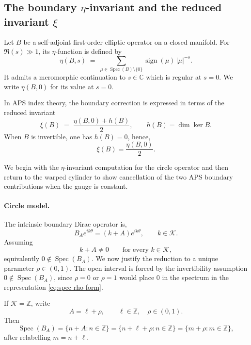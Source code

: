 \documentclass[11pt]{article}
\newcommand{\C}{\mathbb{C}}
\theoremstyle{definition}
\DeclareMathOperator{\Spec}{Spec}
\DeclareMathOperator{\sign}{sign}
\numberwithin{equation}{section}
\begin{document}
\subsection{The boundary $\eta$-invariant and the reduced invariant $\xi$}
\label{subsec:boundary-eta}

Let $B$ be a self-adjoint first-order elliptic operator on a closed manifold.
For $\Re(s)\gg 1$, its $\eta$-function is defined by
\begin{equation}
\label{eq:eta-rewrite}
\eta(B,s)\;=\;\sum_{\mu\in \Spec(B)\setminus\{0\}} \sign(\mu)\,|\mu|^{-s}.
\end{equation}
It admits a meromorphic continuation to $s\in\C$ which is regular at $s=0$. We write \(\eta(B,0)\) for its value at \(s=0\).

In APS index theory, the boundary correction is expressed in terms of the reduced invariant
\begin{equation}
\label{eq:xi-def-header-rewrite}
\xi(B)\;=\;\frac{\eta(B,0)+h(B)}{2},
\qquad
h(B)=\dim\ker B.
\end{equation}
When $B$ is invertible, one has $h(B)=0$, hence,
\begin{equation}
\xi(B)=\frac{\eta(B,0)}{2}.
\end{equation}

We begin with the \(\eta\)-invariant computation for the circle operator and then return to the warped cylinder to show cancellation of the two APS boundary contributions when the gauge is constant.

\paragraph{Circle model.}
The intrinsic boundary Dirac operator is,
\begin{equation}
B_A e^{ik\theta}=(k+A)e^{ik\theta},
\qquad k\in\mathcal K.
\end{equation}
Assuming
\begin{equation}
k+A\neq 0 \qquad \text{for every } k\in\mathcal K,
\end{equation}
equivalently $0\notin\Spec(B_A)$.
We now justify the reduction to a unique parameter \(\rho\in(0,1)\). The open interval is forced by the invertibility assumption \(0\notin\Spec(B_A)\), since \(\rho=0\) or \(\rho=1\) would place \(0\) in the spectrum in the representation \eqref{eq:spec-rho-form}.  


If $\mathcal K=\mathbb Z$, write
\begin{equation}
A=\ell+\rho,\qquad \ell\in\mathbb Z,\quad \rho\in(0,1).
\end{equation}
Then
\begin{equation}
\Spec(B_A)=\{n+A:n\in\mathbb Z\}
=\{n+\ell+\rho:n\in\mathbb Z\}
=\{m+\rho:m\in\mathbb Z\},
\end{equation}
after relabelling $m=n+\ell$.
\end{document}
